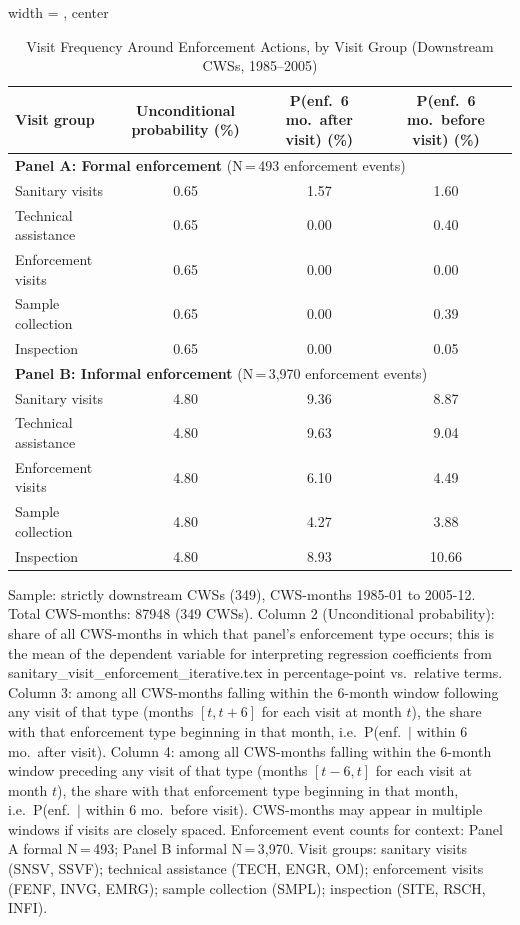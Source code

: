\begin{table}[htbp]
\caption{\label{tab:visit_to_enf} Visit Frequency Around Enforcement Actions, by Visit Group (Downstream CWSs, 1985--2005)}
\bigskip
\centering
\begin{adjustbox}{width = \textwidth, center}
\begin{tabular}{lccc}
\toprule
Visit group & Unconditional probability (\%) & P(enf.\ 6 mo.\ after visit) (\%) & P(enf.\ 6 mo.\ before visit) (\%) \\
\midrule
\multicolumn{4}{l}{\textbf{Panel A: Formal enforcement} (N\,=\,493 enforcement events)} \\
\midrule
Sanitary visits & 0.65 & 1.57 & 1.60 \\
Technical assistance & 0.65 & 0.00 & 0.40 \\
Enforcement visits & 0.65 & 0.00 & 0.00 \\
Sample collection & 0.65 & 0.00 & 0.39 \\
Inspection & 0.65 & 0.00 & 0.05 \\
\midrule
\multicolumn{4}{l}{\textbf{Panel B: Informal enforcement} (N\,=\,3{,}970 enforcement events)} \\
\midrule
Sanitary visits & 4.80 & 9.36 & 8.87 \\
Technical assistance & 4.80 & 9.63 & 9.04 \\
Enforcement visits & 4.80 & 6.10 & 4.49 \\
Sample collection & 4.80 & 4.27 & 3.88 \\
Inspection & 4.80 & 8.93 & 10.66 \\
\bottomrule
\end{tabular}
\end{adjustbox}
{\tiny\linespread{1}\selectfont \par \raggedright 
Sample: strictly downstream CWSs (349), CWS-months 1985-01 to 2005-12. Total CWS-months: 87948 (349 CWSs). Column 2 (Unconditional probability): share of all CWS-months in which that panel's enforcement type occurs; this is the mean of the dependent variable for interpreting regression coefficients from sanitary\_visit\_enforcement\_iterative.tex in percentage-point vs.\ relative terms. Column 3: among all CWS-months falling within the 6-month window following any visit of that type (months $[t, t+6]$ for each visit at month $t$), the share with that enforcement type beginning in that month, i.e.\ P(enf.\ $|$ within 6 mo.\ after visit). Column 4: among all CWS-months falling within the 6-month window preceding any visit of that type (months $[t-6, t]$ for each visit at month $t$), the share with that enforcement type beginning in that month, i.e.\ P(enf.\ $|$ within 6 mo.\ before visit). CWS-months may appear in multiple windows if visits are closely spaced. Enforcement event counts for context: Panel A formal N\,=\,493; Panel B informal N\,=\,3{,}970. Visit groups: sanitary visits (SNSV, SSVF); technical assistance (TECH, ENGR, OM); enforcement visits (FENF, INVG, EMRG); sample collection (SMPL); inspection (SITE, RSCH, INFI).
}
\end{table}
